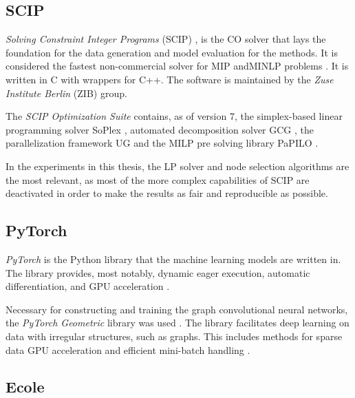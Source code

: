 \subsection{SCIP}

\textit{Solving Constraint Integer Programs }(\gls{SCIP})
\cite{achterberg2009scip}, is the \gls{CO} solver that lays the foundation for the data generation and model evaluation for the methods. It is considered the fastest non-commercial solver for \gls{MIP} and\gls{MINLP} problems \cite{gamrath2020scip}. It is written in C with wrappers for C++. The software is maintained by the\textit{ Zuse Institute Berlin} (ZIB) group. 

The \textit{SCIP Optimization Suite} contains, as of version 7, the simplex-based linear programming solver SoPlex \cite{wunderling1996soplex}, automated decomposition solver GCG \cite{gamrath2010gcg}, the parallelization framework UG \cite{shinano2018ug} and the \gls{MILP} pre solving library PaPILO \cite{gamrath2020scip}.

In the experiments in this thesis, the LP solver and node selection algorithms are the most relevant, as most of the more complex capabilities of \gls{SCIP} are deactivated in order to make the results as fair and reproducible as possible. 





\subsection{PyTorch}

\textit{PyTorch} is the Python library that the machine learning models are written in. The library provides, most notably, dynamic eager execution, automatic differentiation, and \gls{GPU} acceleration \cite{paszke2019pytorch}. 

Necessary for constructing and training the graph convolutional neural networks, the \textit{PyTorch Geometric} library was used \cite{fey2019pytorchgeometric}. The library facilitates deep learning on data with irregular structures, such as graphs. This includes methods for sparse data GPU acceleration and efficient mini-batch handling \cite{fey2019pytorchgeometric}. 




\subsection{Ecole}\label{ssec:ecole}

